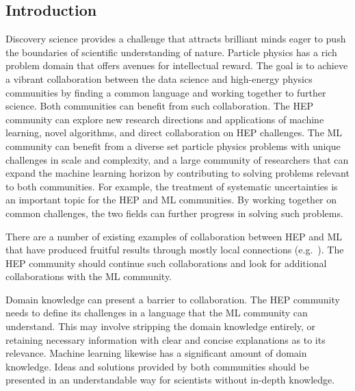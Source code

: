 

\subsection{Introduction}


Discovery science provides a challenge that attracts brilliant minds eager to push the boundaries of scientific understanding of nature. Particle physics has a rich problem domain that offers avenues for intellectual reward. The goal is to achieve a vibrant collaboration between the data science and high-energy physics communities by finding a common language and working together to further science.
Both communities can benefit from such collaboration. The HEP community can explore new research directions and applications of machine learning, novel algorithms, and direct collaboration on HEP challenges. The ML community can benefit from a diverse set particle physics problems with unique challenges in scale and complexity, and a large community of researchers that can expand the machine learning horizon by contributing to solving problems relevant to both communities. For example, the treatment of systematic uncertainties is an important topic for the HEP and ML communities. By working together on common challenges, the two fields can further progress in solving such problems.

There are a number of existing examples of collaboration between HEP and ML that have produced fruitful results through mostly local connections (e.g.~\cite{Likhomanenko:2016tgu,Paganini:2017hrr}). The HEP community should continue such collaborations and look for additional collaborations with the ML community.

Domain knowledge can present a barrier to collaboration. The HEP community needs to define its challenges in a language that the ML community can understand. This may involve stripping the domain knowledge entirely, or retaining necessary information with clear and concise explanations as to its relevance. Machine learning likewise has a significant amount of domain knowledge. Ideas and solutions provided by both communities should be presented in an understandable way for scientists without in-depth knowledge.

